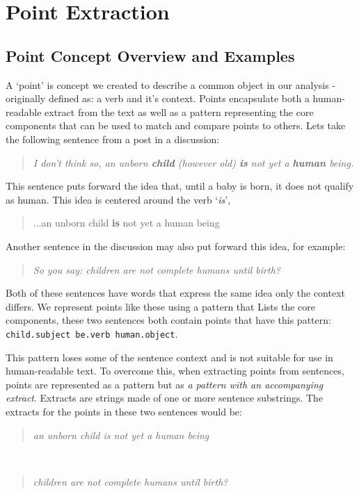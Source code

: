 \chapter{Point Extraction\label{chap:point-extraction}}
  \section{Point Concept Overview and Examples}
    A `point' is concept we created to describe a common object in our analysis - originally defined as: a verb and it's context. Points encapsulate both a human-readable extract from the text as well as a pattern representing the core components that can be used to match and compare points to others. Lets take the following sentence from a post in a discussion:

    \smallskip
    \begin{center}
      \blockquote{\textit{I don't think so, an unborn \textbf{child} (however old) \textbf{is} not yet a \textbf{human} being.}}
    \end{center}
    \smallskip

    This sentence puts forward the idea that, until a baby is born, it does not qualify as human. This idea is centered around the verb `\textit{is}', \blockquote{...an unborn child \textbf{is} not yet a human being}. Another sentence in the discussion may also put forward this idea, for example: \blockquote{\textit{So you say: children are not complete humans until birth?}}. Both of these sentences have words that express the same idea only the context differs. We represent points like these using a pattern that Lists the core components, these two sentences both contain points that have this pattern: \texttt{child.subject be.verb human.object}.

    This pattern loses some of the sentence context and is not suitable for use in human-readable text. To overcome this, when extracting points from sentences, points are represented as a pattern but as \textit{a pattern with an accompanying extract}. Extracts are strings made of one or more sentence substrings. The extracts for the points in these two sentences would be:

    \smallskip
    \begin{center}
      \blockquote{\textit{an unborn child is not yet a human being}} \\ \blockquote{\textit{children are not complete humans until birth?}}
    \end{center}
    \smallskip

